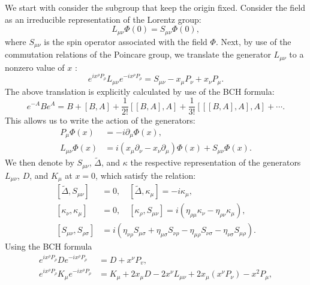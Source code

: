 \documentclass[aps,prb,superscriptaddress,nofootinbib]{revtex4}
\begin{document}
We start with consider the subgroup that keep the origin fixed.
Consider the field as an irreducible representation of the Lorentz group:
\begin{equation}
	L_{\mu\nu} \Phi(0) = S_{\mu\nu}\Phi(0),
\end{equation}
where $S_{\mu \nu}$ is the spin operator associated with the field $\Phi$. 
Next, by use of the commutation relations of the Poincare group, we translate the generator $L_{\mu \nu}$ to a nonzero value of $x$ :
\begin{equation}
	e^{i x^{\rho} P_{\rho}} L_{\mu \nu} e^{-i x^{\rho} P_{\rho}}=S_{\mu \nu}-x_{\mu} P_{\nu}+x_{\nu} P_{\mu}.
\end{equation}
The above translation is explicitly calculated by use of the BCH formula:
\begin{equation}
	e^{-A} B e^{A}=B+[B, A]+\frac{1}{2 !}[[B, A], A]+\frac{1}{3 !}[[[B, A], A], A]+\cdots.
\end{equation}
This allows us to write the action of the generators:
\begin{equation}
\begin{aligned}
	P_{\mu} \Phi(x) &=-i \partial_{\mu} \Phi(x), \\
	L_{\mu \nu} \Phi(x) &=i\left(x_{\mu} \partial_{\nu}-x_{\nu} \partial_{\mu}\right) \Phi(x)+S_{\mu \nu} \Phi(x).
\end{aligned}
\end{equation}
We then denote by $S_{\mu\nu}$, $\tilde \Delta$, and $\kappa$ the respective representation of 	the generators $L_{\mu\nu}$, $D$, and $K_\mu$ at $x=0$, which satisfy the relation:
\begin{equation}
\begin{aligned}
	{\left[\tilde{\Delta}, S_{\mu \nu}\right] } &=0, \quad
	{\left[\tilde{\Delta}, \kappa_{\mu}\right] } =-i \kappa_{\mu}, \\
	{\left[\kappa_{\nu}, \kappa_{\mu}\right] } &=0, \quad
	{\left[\kappa_{\rho}, S_{\mu \nu}\right] } =i\left(\eta_{\rho \mu} \kappa_{\nu}-\eta_{\rho \nu} \kappa_{\mu}\right), \\
	{\left[S_{\mu \nu}, S_{\rho \sigma}\right] } &=i\left(\eta_{\nu \rho} S_{\mu \sigma}+\eta_{\mu \sigma} S_{\nu \rho}-\eta_{\mu \rho} S_{\nu \sigma}-\eta_{\nu \sigma} S_{\mu \rho}\right).
\end{aligned}
\end{equation}
Using the BCH formula
\begin{equation}
\begin{aligned}
	e^{i x^{\rho} P_{\rho}} D e^{-i x^{\rho} P_{\rho}} &=D+x^{\nu} P_{v}, \\
	e^{i x^{\rho} P_{\rho}} K_{\mu} e^{-i x^{\rho} P_{\rho}} &=K_{\mu}+2 x_{\mu} D-2 x^{\nu} L_{\mu \nu}+2 x_{\mu}\left(x^{\nu} P_{\nu}\right)-x^{2} P_{\mu},
\end{aligned}
\end{equation}
\end{document}
